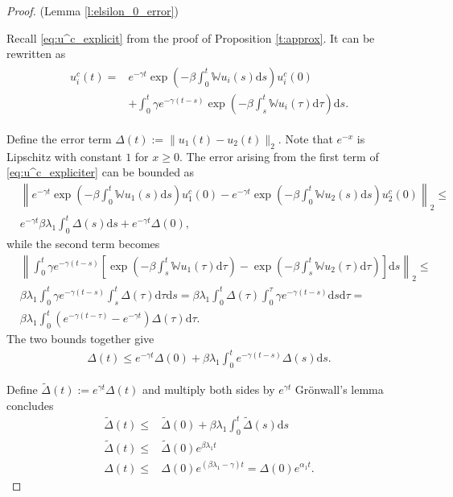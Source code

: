 \documentclass{article}
\renewcommand{\d}{\mathrm{d}}
\newcommand{\W}{\mathbb{W}}
\newcommand{\1}[1]{{\mathds{1}}_{\left\{#1\right\}}}
\begin{document}
\begin{proof}(Lemma \ref{l:elsilon_0_error})
	
	Recall \eqref{eq:u^c_explicit} from the proof of Proposition \ref{t:approx}. It can be rewritten as
	\begin{align}
		\label{eq:u^c_expliciter}
		\begin{split}
			u_i^c(t)=&e^{-\gamma t} \exp \left(-\beta \int_{0}^{t} \W u_i(s) \d s\right)u_i^c(0)\\
			&+\int_{0}^{t} \gamma e^{-\gamma(t-s)} \exp \left(-\beta \int_{s}^{t} \W u_i(\tau) \d \tau \right) \d s.
		\end{split}
	\end{align}
	
	Define the error term $\Delta(t):= \|u_1(t)-u_2(t) \|_2.$ Note that $e^{-x}$ is Lipschitz with constant $1$ for $x \geq 0.$ The error arising from the first term of \eqref{eq:u^c_expliciter} can be bounded as
	\begin{align*}
		&\left \|e^{-\gamma t} \exp \left(-\beta \int_{0}^{t} \W u_1(s) \d s\right)u_1^c(0)-e^{-\gamma t} \exp \left(-\beta \int_{0}^{t} \W u_2(s) \d s\right)u_2^c(0) \right \|_2 \leq \\
		& e^{-\gamma t}\beta \lambda_1 \int_{0}^{t} \Delta (s) \d s+e^{-\gamma t} \Delta(0),
	\end{align*}
	while the second term becomes
	\begin{align*}
		&\left \| \int_{0}^{t} \gamma e^{-\gamma(t-s)} \left[  \exp \left(-\beta \int_{s}^{t} \W u_1(\tau) \d \tau \right)-\exp \left(-\beta \int_{s}^{t} \W u_2(\tau) \d \tau \right)  \right] \d s \right \|_2 \leq \\
		&\beta \lambda_1 \int_{0}^{t}\gamma e^{-\gamma(t-s)} \int_{s}^{t} \Delta(\tau) \d \tau \d s=\beta \lambda_1 \int_{0}^{t} \Delta(\tau) \int_{0}^{\tau} \gamma e^{-\gamma(t-s)} \d s \d \tau= \\
		&\beta \lambda_1 \int_{0}^{t} \left(e^{-\gamma(t-\tau) }-e^{-\gamma t} \right) \Delta(\tau) \d \tau .
	\end{align*}
	The two bounds together give
	\begin{align}
		\label{eq:Delta_error}
		\Delta(t) \leq e^{-\gamma t}\Delta(0)+\beta \lambda_1 \int_{0}^{t}e^{-\gamma(t-s)} \Delta(s) \d s.
	\end{align}
	
	Define $\tilde{\Delta}(t):=e^{\gamma t} \Delta(t)$ and multiply both sides by $e^{\gamma t}$ Grönwall's lemma concludes
	\begin{align*}
		\tilde{\Delta}(t) \leq& \tilde{\Delta}(0)+\beta \lambda_1 \int_{0}^{t} \tilde{\Delta}(s) \d s \\
		\tilde{\Delta}(t) \leq& \tilde{\Delta}(0)e^{\beta \lambda_1 t} \\ 
		\Delta(t) \leq & \Delta(0)e^{(\beta \lambda_1-\gamma)t}=\Delta(0)e^{\alpha_1 t}.
	\end{align*}
\end{proof}
\end{document}
